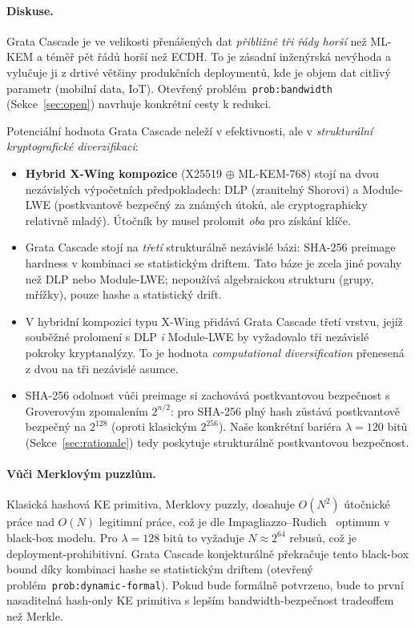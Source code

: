 \documentclass[11pt,a4paper]{article}
\begin{document}
\paragraph{Diskuse.} Grata Cascade je ve velikosti přenášených dat \emph{přibližně tři řády horší} než ML-KEM a téměř pět řádů horší než ECDH. To je zásadní inženýrská nevýhoda a vylučuje ji z drtivé většiny produkčních deploymentů, kde je objem dat citlivý parametr (mobilní data, IoT). Otevřený problém~\texttt{prob:bandwidth} (Sekce~\ref{sec:open}) navrhuje konkrétní cesty k redukci.

Potenciální hodnota Grata Cascade neleží v efektivnosti, ale v \emph{strukturální kryptografické diverzifikaci}:

\begin{itemize}[leftmargin=*]
\item \textbf{Hybrid X-Wing kompozice} (X25519 $\oplus$ ML-KEM-768) stojí na dvou nezávislých výpočetních předpokladech: DLP (zranitelný Shorovi) a Module-LWE (postkvantově bezpečný za známých útoků, ale cryptographicky relativně mladý). Útočník by musel prolomit \emph{oba} pro získání klíče.
\item Grata Cascade stojí na \emph{třetí} strukturálně nezávislé bázi: SHA-256 preimage hardness v kombinaci se statistickým driftem. Tato báze je zcela jiné povahy než DLP nebo Module-LWE; nepoužívá algebraickou strukturu (grupy, mřížky), pouze hashe a statistický drift.
\item V hybridní kompozici typu X-Wing přidává Grata Cascade třetí vrstvu, jejíž souběžné prolomení s DLP \emph{i} Module-LWE by vyžadovalo tři nezávislé pokroky kryptanalýzy. To je hodnota \emph{computational diversification} přenesená z dvou na tři nezávislé asumce.
\item SHA-256 odolnost vůči preimage si zachovává postkvantovou bezpečnost s Groverovým zpomalením $2^{n/2}$: pro SHA-256 plný hash zůstává postkvantově bezpečný na $2^{128}$ (oproti klasickým $2^{256}$). Naše konkrétní bariéra $\lambda = 120$ bitů (Sekce~\ref{sec:rationale}) tedy poskytuje strukturálně postkvantovou bezpečnost.
\end{itemize}

\paragraph{Vůči Merklovým puzzlům.} Klasická hashová KE primitiva, Merklovy puzzly, dosahuje $O(N^2)$ útočnické práce nad $O(N)$ legitimní práce, což je dle Impagliazzo--Rudich~\cite{IR1989} optimum v black-box modelu. Pro $\lambda = 128$ bitů to vyžaduje $N \approx 2^{64}$ rebusů, což je deployment-prohibitivní. Grata Cascade konjekturálně překračuje tento black-box bound díky kombinaci hashe se statistickým driftem (otevřený problém~\texttt{prob:dynamic-formal}). Pokud bude formálně potvrzeno, bude to první nasaditelná hash-only KE primitiva s lepším bandwidth-bezpečnost tradeoffem než Merkle.
\end{document}
